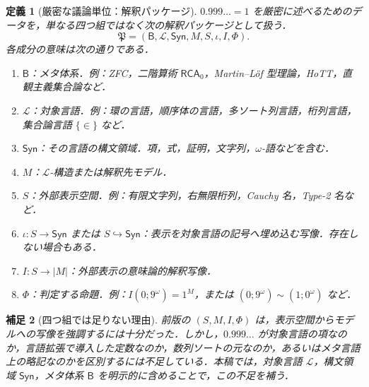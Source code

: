 \documentclass[a4paper,11pt]{ltjsarticle}
\theoremstyle{jpdef}
\newtheorem{definition}{定義}[section]
\newtheorem{remark}[definition]{補足}
\theoremstyle{jpthm}
\newcommand{\Lang}{\mathcal L}
\begin{document}
\begin{definition}[厳密な議論単位：解釈パッケージ]
\(0.999\ldots=1\) を厳密に述べるためのデータを，単なる四つ組ではなく次の解釈パッケージとして扱う．
\[
  \mathfrak P=(\mathsf B,\Lang,\mathsf{Syn},M,S,\iota,I,\Phi).
\]
各成分の意味は次の通りである．
\begin{enumerate}
\item \(\mathsf B\)：メタ体系．例：ZFC，二階算術 \(\mathsf{RCA}_0\)，Martin--Löf 型理論，HoTT，直観主義集合論など．
\item \(\Lang\)：対象言語．例：環の言語，順序体の言語，多ソート列言語，桁列言語，集合論言語 \(\{\in\}\) など．
\item \(\mathsf{Syn}\)：その言語の構文領域．項，式，証明，文字列，\(\omega\)-語などを含む．
\item \(M\)：\(\Lang\)-構造または解釈先モデル．
\item \(S\)：外部表示空間．例：有限文字列，右無限桁列，Cauchy 名，Type-2 名など．
\item \(\iota:S\to \mathsf{Syn}\) または \(S\hookrightarrow\mathsf{Syn}\)：表示を対象言語の記号へ埋め込む写像．存在しない場合もある．
\item \(I:S\to |M|\)：外部表示の意味論的解釈写像．
\item \(\Phi\)：判定する命題．例：\(I(0;9^\omega)=1^M\)，または \((0;9^\omega)\sim(1;0^\omega)\) など．
\end{enumerate}
\end{definition}

\begin{remark}[四つ組では足りない理由]
前版の \((S,M,I,\Phi)\) は，表示空間からモデルへの写像を強調するには十分だった．しかし，\(0.999\ldots\) が対象言語の項なのか，言語拡張で導入した定数なのか，数列ソートの元なのか，あるいはメタ言語上の略記なのかを区別するには不足している．本稿では，対象言語 \(\Lang\)，構文領域 \(\mathsf{Syn}\)，メタ体系 \(\mathsf B\) を明示的に含めることで，この不足を補う．
\end{remark}
\end{document}
